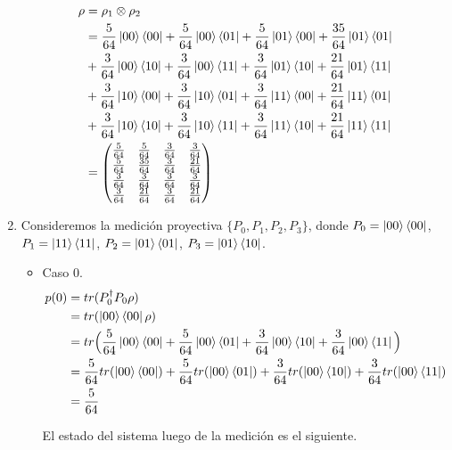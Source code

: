 \documentclass[a4paper,11pt]{article}
\begin{document}
\begin{enumerate}[label=\alph*)]
\begin{align*}
  \rho 
  &= \rho_1 \otimes \rho_2  
  \\ &= \frac{5}{64} \ket{00}\bra{00} + \frac{5}{64} \ket{00}\bra{01} + \frac{5}{64}\ket{01}\bra{00} + \frac{35}{64} \ket{01}\bra{01}
  \\ & + \frac{3}{64} \ket{00}\bra{10} + \frac{3}{64} \ket{00}\bra{11} + \frac{3}{64} \ket{01}\bra{10} + \frac{21}{64} \ket{01}\bra{11}
  \\ & + \frac{3}{64} \ket{10}\bra{00} + \frac{3}{64} \ket{10}\bra{01} + \frac{3}{64} \ket{11}\bra{00} + \frac{21}{64} \ket{11}\bra{01}
  \\ & + \frac{3}{64} \ket{10}\bra{10} + \frac{3}{64} \ket{10}\bra{11} + \frac{3}{64} \ket{11}\bra{10} + \frac{21}{64} \ket{11}\bra{11}
  \\ &= 
\begin{pmatrix}
\frac{5}{64} & \frac{5}{64} & \frac{3}{64} & \frac{3}{64}\\ 
\frac{5}{64} & \frac{35}{64} & \frac{3}{64} & \frac{21}{64}\\ 
 \frac{3}{64}& \frac{3}{64} & \frac{3}{64} & \frac{3}{64}\\ 
\frac{3}{64} & \frac{21}{64} & \frac{3}{64} & \frac{21}{64}
\end{pmatrix}
\end{align*}

\item Consideremos la medición proyectiva $\{ P_0, P_1, P_2, P_3 \}$, donde $P_0 = \ket{00}\bra{00}$, $P_1=\ket{11}\bra{11}$, 
$P_2 = \ket{01}\bra{01}$, $P_3 = \ket{01}\bra{10}$.

\begin{itemize}
\item Caso 0.
  \begin{align*}
    p(0)
    &= tr( P_0^{\dag} P_0 \rho )
    \\ &=  tr( \ket{00}\bra{00} \rho )
    \\ &= tr \Big( \frac{5}{64}\ket{00}\bra{00} + \frac{5}{64} \ket{00}\bra{01} + \frac{3}{64} \ket{00}\bra{10} + 
         \frac{3}{64}\ket{00}\bra{11} \Big)
    \\ &= \frac{5}{64} tr (\ket{00}\bra{00}) + \frac{5}{64} tr(\ket{00}\bra{01}) + \frac{3}{64} tr(\ket{00}\bra{10}) +
         \frac{3}{64} tr(\ket{00}\bra{11})
    \\ &= \frac{5}{64}
  \end{align*}

  El estado del sistema luego de la medición es el siguiente.


\end{itemize}
\end{enumerate}
\end{document}
